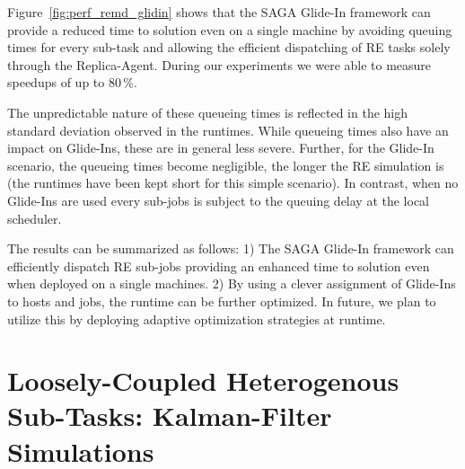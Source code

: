 \documentclass[conference,final]{IEEEtran}
\newcommand{\up}{\vspace*{-1em}}
\begin{document}
Figure~\ref{fig:perf_remd_glidin} shows that the SAGA Glide-In
framework can provide a reduced time to solution even on a single
machine by avoiding queuing times for every sub-task and allowing the
efficient dispatching of RE tasks solely through the
Replica-Agent. During our experiments we were able to measure speedups
of up to 80\,\%.

The unpredictable nature of these queueing times is reflected in the
high standard deviation observed in the runtimes. While queueing times
also have an impact on Glide-Ins, these are in general less severe.
Further, for the Glide-In scenario, the queueing times become
negligible, the longer the RE simulation is (the runtimes have been
kept short for this simple scenario). In contrast, when no Glide-Ins
are used every sub-jobs is subject to the queuing delay at the local
scheduler.

The results can be summarized as follows: 1) The SAGA Glide-In
framework can efficiently dispatch RE sub-jobs providing an enhanced
time to solution even when deployed on a single machines. 2) By using
a clever assignment of Glide-Ins to hosts and jobs, the runtime can be
further optimized. In future, we plan to utilize this by deploying
adaptive optimization strategies at runtime.





\up

\section{Loosely-Coupled Heterogenous
Sub-Tasks: Kalman-Filter Simulations}

\up
\end{document}
